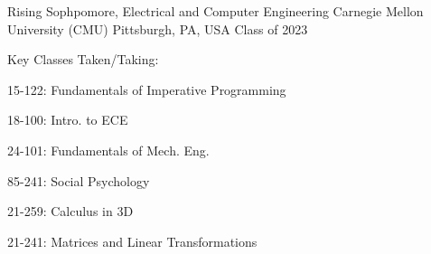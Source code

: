 


\begin{cventries}


\cventry
{Rising Sophpomore, Electrical and Computer Engineering} %
{Carnegie Mellon University (CMU)} %
{Pittsburgh, PA, USA} %
{Class of 2023} %
{ %
	Key Classes Taken/Taking: \bigskip \smallskip
	\begin{cvitems}
		\item 15-122: Fundamentals of Imperative Programming
		\item 18-100: Intro. to ECE
		\item 24-101: Fundamentals of Mech. Eng.
		\item 85-241: Social Psychology
		\item 21-259: Calculus in 3D
		\item 21-241: Matrices and Linear Transformations
	\end{cvitems}
}


\end{cventries}